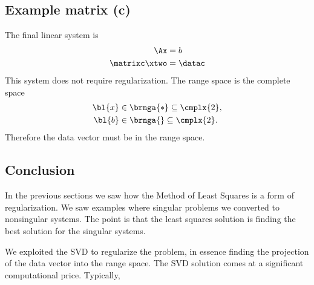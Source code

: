 \subsection{Example matrix (c)}
The final linear system is
\begin{equation}
  \begin{split}
    \Ax &= b \\
    \matrixc \xtwo &= \datac
  \end{split}
\end{equation}
%
This system does not require regularization. The range space is the complete space
%
\begin{equation}
  \begin{split}
    {\bl{ x }} &\in \brnga{*} \subseteq \cmplx{2}, \\
    {\bl{ b }} &\in \brnga{} \subseteq \cmplx{2}.
  \end{split}
\end{equation}
Therefore the data vector must be in the range space.

\subsection{Conclusion}
In the previous sections we saw how the Method of Least Squares is a form of regularization. We saw examples where singular problems we converted to nonsingular systems. The point is that the least squares solution is finding the best solution for the singular systems.

We exploited the SVD to regularize the problem, in essence finding the projection of the data vector into the range space. The SVD solution comes at a significant computational price. Typically, 

\endinput